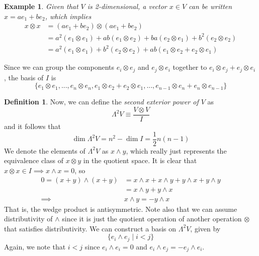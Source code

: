 \documentclass{article}
\newtheorem{example}{Example}[section]
\theoremstyle{remark}
\theoremstyle{definition}
\newtheorem{definition}{Definition}[section]
\begin{document}
    \begin{example}
    Given that $V$ is 2-dimensional, a vector $x \in V$ can be written $x = a e_1 + b e_2$, which implies
    \begin{align*}
        x \otimes x & = (a e_1 + b e_2) \otimes (a e_1 + b e_2) \\
        & = a^2 (e_1 \otimes e_1) + a b (e_1 \otimes e_2) + b a (e_2 \otimes e_1) + b^2 (e_2 \otimes e_2) \\
        & = a^2 (e_1 \otimes e_1) + b^2 (e_2 \otimes e_2) + a b (e_1 \otimes e_2 + e_2 \otimes e_1) 
    \end{align*}
    \end{example}

    Since we can group the components $e_i \otimes e_j$ and $e_j \otimes e_i$ together to $e_i \otimes e_j + e_j \otimes e_i$, the basis of $I$ is 
    \[\{e_1 \otimes e_1, ..., e_n \otimes e_n, e_1 \otimes e_2 + e_2 \otimes e_1, ..., e_{n-1} \otimes e_n + e_n \otimes e_{n-1}\}\]

    \begin{definition}
    Now, we can define the \textit{second exterior power of $V$} as
    \[\Lambda^2 V \equiv \frac{V \otimes V}{I}\]
    and it follows that 
    \[\dim{\Lambda^2 V} = n^2 - \dim{I} = \frac{1}{2} n (n-1)\]
    We denote the elements of $\Lambda^2 V$ as $x \wedge y$, which really just represents the equivalence class of $x \otimes y$ in the quotient space. It is clear that $x \otimes x \in I \implies x \wedge x = 0$, so
    \begin{align*}
        0 = (x + y) \wedge (x + y) & = x \wedge x + x \wedge y + y \wedge x + y \wedge y \\
        & = x \wedge y + y \wedge x \\
        \implies & x \wedge y = - y \wedge x
    \end{align*}
    That is, the wedge product is antisymmetric. Note also that we can assume distributivity of $\wedge$ since it is just the quotient operation of another operation $\otimes$ that satisfies distributivity. We can construct a basis on $\Lambda^2 V$, given by 
    \[\{e_i \wedge e_j \; | \; i < j\}\]
    Again, we note that $i < j$ since $e_i \wedge e_i = 0$ and $e_i \wedge e_j = - e_j \wedge e_i$. 
    \end{definition}
\end{document}

